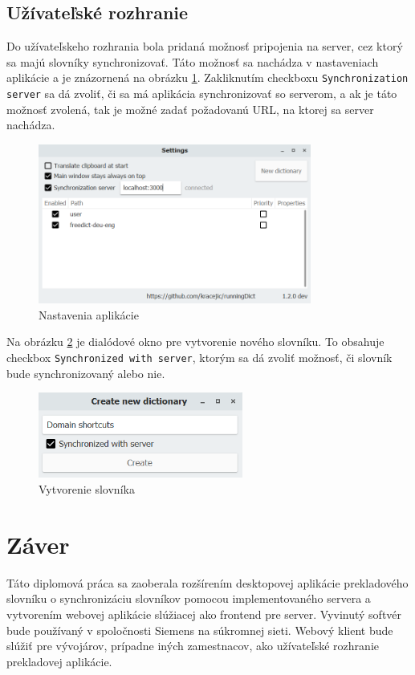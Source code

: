 \documentclass[
  digital, %
  table,   %
  lof,     %
  lot,     %
]{fithesis3}
\begin{document}
\section{Užívateľské rozhranie}
Do užívateľskeho rozhrania bola pridaná možnosť pripojenia na server, cez ktorý sa majú slovníky synchronizovať. Táto možnosť sa nachádza v nastaveniach aplikácie a je znázornená na obrázku \ref{fig:desktop-settings}. Zakliknutím checkboxu \texttt{Synchronization server} sa dá zvoliť, či sa má aplikácia synchronizovať so serverom, a ak je táto možnosť zvolená, tak je možné zadať požadovanú URL, na ktorej sa server nachádza.
\begin{figure}
	\begin{center}
	\includegraphics[width=0.8\textwidth]{img/desktop-settings.png}
	\end{center}
    \caption{Nastavenia aplikácie}
	\label{fig:desktop-settings}
\end{figure}

Na obrázku \ref{fig:desktop-ispublic} je dialódové okno pre vytvorenie nového slovníku. To obsahuje checkbox \texttt{Synchronized with server}, ktorým sa dá zvoliť možnosť, či slovník bude synchronizovaný alebo nie.
\begin{figure}
	\begin{center}
	\includegraphics[width=0.6\textwidth]{img/desktop-ispublic.png}
	\end{center}
    \caption{Vytvorenie slovníka}
	\label{fig:desktop-ispublic}
\end{figure}

\chapter{Záver}
Táto diplomová práca sa zaoberala rozšírením desktopovej aplikácie prekladového slovníku o synchronizáciu slovníkov pomocou implementovaného servera a vytvorením webovej aplikácie slúžiacej ako frontend pre server. Vyvinutý softvér bude používaný v spoločnosti Siemens na súkromnej sieti. Webový klient bude slúžiť pre vývojárov, prípadne iných zamestnacov, ako užívateľské rozhranie prekladovej aplikácie.
\end{document}
